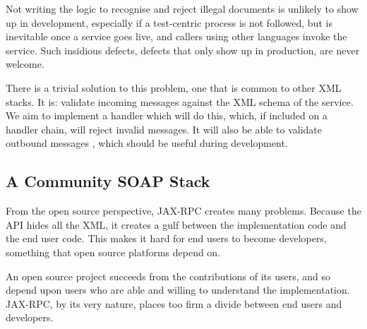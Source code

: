 Not writing the logic to recognise and reject illegal documents is
unlikely to show up in development, especially if a test-centric
process is not followed, but is inevitable once a service goes live,
and callers using other languages invoke the service. Such insidious
defects, defects that only show up in production, are never welcome.

There is a trivial solution to this problem, one that is common to other XML
stacks. It is: validate incoming messages against the XML schema of the service.
We aim to implement a handler which will do this, which, if included on a
handler chain, will reject invalid messages. It will also be able to validate
outbound messages , which should be useful during development.

\subsection{A Community SOAP Stack}
\label{alpine:community}

From the open source perspective, JAX-RPC creates many problems. Because the API
hides all the XML, it creates a gulf between the implementation code and the end
user code. This makes it hard for end users to become developers, something that
open source platforms depend on.

An open source project succeeds from the contributions of its users,
and so depend upon users who are able and willing to understand the
implementation. JAX-RPC, by its very nature, places too firm a divide
between end users and developers.

% 

